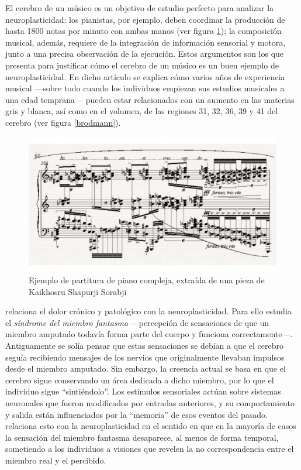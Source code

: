 El cerebro de un músico es un objetivo de estudio perfecto para analizar la neuroplasticidad: los pianistas, por ejemplo, deben coordinar la producción de hasta 1800 notas por minuto con ambas manos (ver figura \ref{fig::partitura}); la composición musical, además, requiere de la integración de información sensorial y motora, junto a una precisa observación de la ejecución. Estos argumentos son los que presenta \cite{Munte2002} para justificar cómo el cerebro de un músico es un buen ejemplo de neuroplasticidad. En dicho artículo se explica cómo varios años de experiencia musical ---sobre todo cuando los individuos empiezan sus estudios musicales a una edad temprana--- pueden estar relacionados con un aumento en las materias gris y blanca, así como en el volumen, de las regiones 31, 32, 36, 39 y 41 del cerebro (ver figura \ref{brodmann}).

\begin{figure}[h]
  \begin{center}
    \includegraphics[width=\textwidth]{images/piano.jpg}
    \caption[Partitura de piano compleja]{Ejemplo de partitura de piano compleja, extraída de una pieza de Kaikhosru Shapurji Sorabji}
    \label{fig::partitura}
  \end{center}
\end{figure}


\cite{Melzack2001} relaciona el dolor crónico y patológico con la neuroplasticidad. Para ello estudia el {\it síndrome del miembro fantasma} ---percepción de sensaciones de que un miembro amputado todavía forma parte del cuerpo y funciona correctamente---. Antiguamente se solía pensar que estas sensaciones se debían a que el cerebro seguía recibiendo mensajes de los nervios que originalmente llevaban impulsos desde el miembro amputado. Sin embargo, la creencia actual se basa en que el cerebro sigue conservando un área dedicada a dicho miembro, por lo que el individuo sigue ``sintiéndolo''. Los estímulos sensoriales actúan sobre sistemas neuronales que fueron modificados por entradas anteriores, y su comportamiento y salida están influenciados por la ``memoria'' de esos eventos del pasado. \cite{Melzack2001} relaciona esto con la neuroplasticidad en el sentido en que en la mayoría de casos la sensación del miembro fantasma desaparece, al menos de forma temporal, sometiendo a los individuos a visiones que revelen la no correspondencia entre el miembro real y el percibido.

